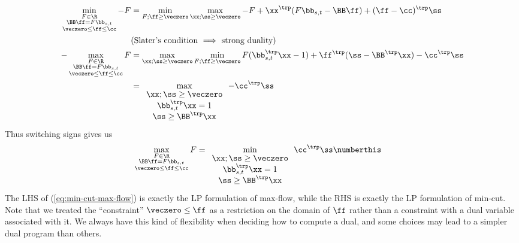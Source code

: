 \begin{example}
\begin{align*}
    \min_{\begin{subarray}{c} F\in\R \\ \BB\ff=F\bb_{s,t} \\ \veczero\leq\ff\leq\cc \end{subarray}} -F
    &= \min_{F;\ff\geq\veczero} \max_{\xx;\ss\geq\veczero} -F + \xx^\trp(F\bb_{s,t}-\BB\ff) + (\ff-\cc)^\trp\ss \\
    & \text{(Slater's condition $\implies$ strong duality)} \\
    -\max_{\begin{subarray}{c} F\in\R \\ \BB\ff=F\bb_{s,t} \\ \veczero\leq\ff\leq\cc \end{subarray}} F
    &= \max_{\xx;\ss\geq\veczero} \min_{F;\ff\geq\veczero} F(\bb_{s,t}^\trp\xx-1) + \ff^\trp(\ss-\BB^\trp\xx) -\cc^\trp\ss \\
    &= \max_{\begin{array}{c} \xx;\ss\geq\veczero \\ \bb_{s,t}^\trp\xx=1 \\ \ss\geq\BB^\trp\xx
             \end{array}} -\cc^\trp\ss
  \end{align*}
  Thus switching signs gives us
    \begin{align*}
    \max_{\begin{subarray}{c} F\in\R \\ \BB\ff=F\bb_{s,t} \\ \veczero\leq\ff\leq\cc \end{subarray}} F
    &= \min_{\begin{array}{c} \xx;\ss\geq\veczero \\ \bb_{s,t}^\trp\xx=1 \\ \ss\geq\BB^\trp\xx
    \end{array}} \cc^\trp\ss \numberthis \label{eq:min-cut-max-flow}
  \end{align*}
  The LHS of (\ref{eq:min-cut-max-flow}) is exactly the LP formulation
  of max-flow, while the RHS is exactly the LP formulation of min-cut.
  Note that we treated the ``constraint'' $ \veczero\leq\ff$ as a
  restriction on the domain of $\ff$ rather than a constraint with a
  dual variable associated with it.
  We always have this kind of flexibility when deciding how to compute
  a dual, and some choices may lead to a simpler dual program than others.
\end{example}

